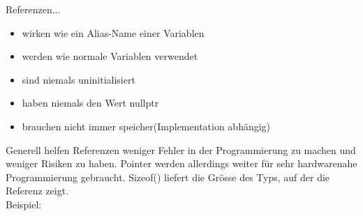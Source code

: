 Referenzen...
\begin{itemize}[itemsep=1pt, parsep=0pt]
    \item wirken wie ein Alias-Name einer Variablen
    \item werden wie normale Variablen verwendet
    \item sind niemals uninitialisiert
    \item haben niemals den Wert nullptr
    \item brauchen nicht immer speicher(Implementation abhängig)
\end{itemize}

Generell helfen Referenzen weniger Fehler in der Programmierung zu machen und weniger Risiken zu haben. 
Pointer werden allerdings weiter für sehr hardwarenahe Programmierung gebraucht. 
Sizeof() liefert die Grösse des Typs, auf der die Referenz zeigt.\\
Beispiel:

